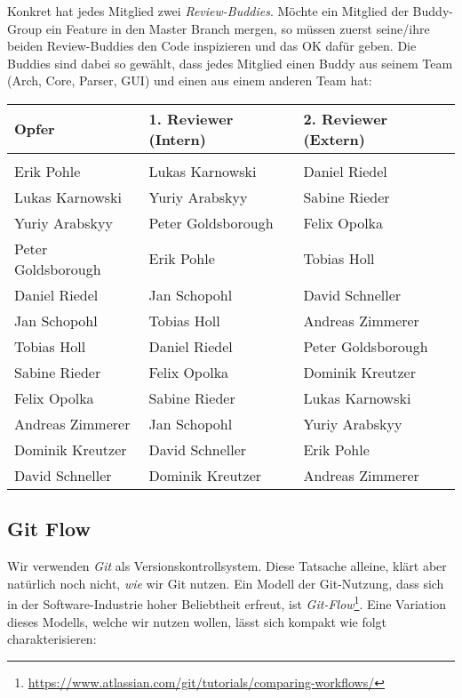Konkret hat jedes Mitglied zwei \emph{Review-Buddies}. Möchte ein Mitglied der
Buddy-Group ein Feature in den Master Branch mergen, so müssen zuerst seine/ihre
beiden Review-Buddies den Code inspizieren und das OK dafür geben. Die Buddies
sind dabei so gewählt, dass jedes Mitglied einen Buddy aus seinem Team (Arch,
Core, Parser, GUI) und einen aus einem anderen Team hat:

\begin{table}[h!]
  \centering
  \begin{tabular}{lll}
    \textbf{Opfer} & \textbf{1. Reviewer (Intern)} & \textbf{2. Reviewer (Extern)} \\
    \toprule \\
    Erik Pohle & Lukas Karnowski & Daniel Riedel \\
    Lukas Karnowski & Yuriy Arabskyy &  Sabine Rieder \\
    Yuriy Arabskyy & Peter Goldsborough & Felix Opolka \\
    Peter Goldsborough & Erik Pohle & Tobias Holl \\

    Daniel Riedel & Jan Schopohl & David Schneller \\
    Jan Schopohl & Tobias Holl & Andreas Zimmerer \\
    Tobias Holl & Daniel Riedel & Peter Goldsborough \\

    Sabine Rieder & Felix Opolka & Dominik Kreutzer \\
    Felix Opolka & Sabine Rieder & Lukas Karnowski \\
    Andreas Zimmerer & Jan Schopohl & Yuriy Arabskyy \\

    Dominik Kreutzer & David Schneller & Erik Pohle \\
    David Schneller & Dominik Kreutzer &  Andreas Zimmerer \\
    \bottomrule
  \end{tabular}
\end{table}

\subsection{Git Flow}

Wir verwenden \emph{Git} als Versionskontrollsystem. Diese Tatsache alleine,
klärt aber natürlich noch nicht, \emph{wie} wir Git nutzen. Ein Modell der
Git-Nutzung, dass sich in der Software-Industrie hoher Beliebtheit erfreut, ist
\emph{Git-Flow}\footnote{\url{https://www.atlassian.com/git/tutorials/comparing-workflows/}}. Eine
Variation dieses Modells, welche wir nutzen wollen, lässt sich kompakt wie folgt
charakterisieren:

